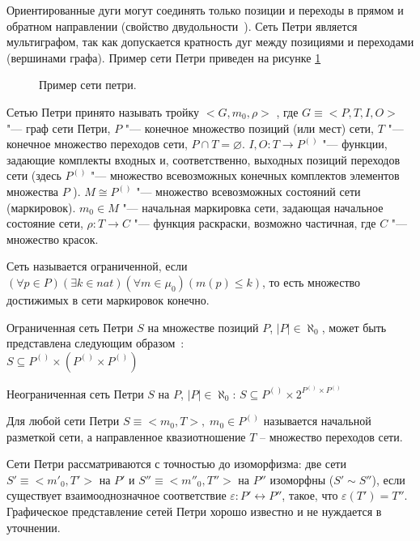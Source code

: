 	  Ориентированные дуги могут соединять только позиции и переходы в прямом и обратном направлении (свойство двудольности~\cite{piterson}). Сеть Петри является мультиграфом, так как допускается кратность дуг между позициями и переходами (вершинами графа). Пример сети Петри приведен на рисунке \ref{img:petri-net}
	  
	  	\begin{figure}[h!]
	  		\caption{Пример сети петри.}
	  		\label{img:petri-net}
	  	\end{figure}
	  
	  Сетью Петри принято называть тройку $<G, m_0,\rho>$  , где  $G\equiv<P,T,I,O>$ "--- граф сети Петри, $P$   "--- конечное множество позиций (или мест) сети, $T$ "--- конечное множество переходов сети, $P \cap T = \varnothing$. $I,O:T\rightarrow P^{()}$  "--- функции, задающие комплекты входных и, соответственно, выходных позиций переходов сети (здесь $P^{()}$  "--- множество всевозможных конечных комплектов элементов множества $P$ ). $M \cong P^{()}$ "--- множество всевозможных состояний сети (маркировок).  $m_0 \in M$ "--- начальная маркировка сети, задающая начальное состояние сети, $\rho:T\rightarrow C$ "--- функция раскраски, возможно частичная, где $C$  "--- множество красок.
	  
	  Сеть называется ограниченной, если $ (\forall p \in P) (\exists k \in \textit{nat}) (\forall m \in \mu_0) (m(p) \leq k)$, то есть множество достижимых в сети маркировок конечно.
	  
	Ограниченная сеть Петри $S$ на множестве позиций $P$, $|P|\in \aleph_0$, может быть представлена следующим образом~\cite{falkTheory}:\\ 
	$ S \subseteq P^{()} \times (P^{()} \times P^{()}) $
	
	Неограниченная сеть Петри $S$ на  $P$, $|P|\in \aleph_0$:	$ S \subseteq P^{()} \times 2^{P^{()} \times P^{()}} $
	
	Для любой сети Петри $S\equiv < m_0, T >,\;  m_0 \in P^{()}$ называется начальной разметкой сети, а направленное квазиотношение $T$ -- множество переходов сети.
	
	Сети Петри рассматриваются с точностью до изоморфизма: две сети $S'\equiv<{m'}_0, T'>$ на $P'$ и $S''\equiv<{m''}_0, T''>$ на $P''$ изоморфны ($ S' \sim S'' $), если существует взаимооднозначное соответствие $ \varepsilon:P'\leftrightarrow P'' $, такое, что $ \varepsilon(T') = T'' $. Графическое представление сетей Петри хорошо известно и не нуждается в уточнении.
	
